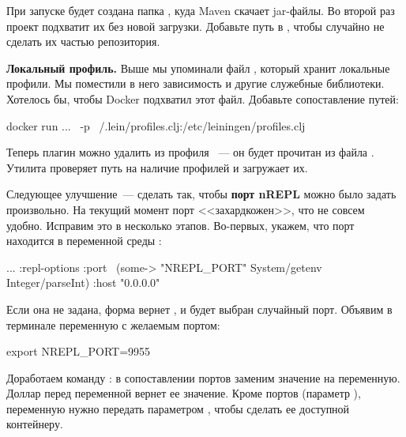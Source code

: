 При запуске  будет создана папка , куда Maven скачает jar-файлы. Во второй раз проект подхватит их без новой загрузки. Добавьте путь  в , чтобы случайно не сделать их частью репозитория.

\textbf{Локальный профиль.} Выше мы упоминали файл , который хранит локальные профили. Мы поместили в него зависимость  и другие служебные библиотеки. Хотелось бы, чтобы Docker подхватил этот файл. Добавьте сопоставление путей:

\begin{english}
  \begin{bash}
docker run ... \
  -p ~/.lein/profiles.clj:/etc/leiningen/profiles.clj
  \end{bash}
\end{english}

Теперь плагин  можно удалить из профиля ~--- он будет прочитан из файла . Утилита  проверяет путь  на наличие профилей и загружает их.


Следующее улучшение~--- сделать так, чтобы \textbf{порт nREPL} можно было задать произвольно. На текущий момент порт <<захардкожен>>, что не совсем удобно. Исправим это в несколько этапов. Во-первых, укажем, что порт находится в переменной среды :

\begin{english}
  \begin{clojure}
{...
 :repl-options
   {:port ~(some-> "NREPL_PORT"
                   System/getenv
                   Integer/parseInt)
    :host "0.0.0.0"}}
  \end{clojure}
\end{english}

Если она не задана, форма  вернет , и будет выбран случайный порт. Объявим в терминале переменную с желаемым портом:

\begin{english}
  \begin{bash}
export NREPL_PORT=9955
  \end{bash}
\end{english}

Доработаем команду : в сопоставлении портов заменим значение на переменную. Доллар перед переменной вернет ее значение. Кроме портов (параметр ), переменную нужно передать параметром , чтобы сделать ее доступной контейнеру.

